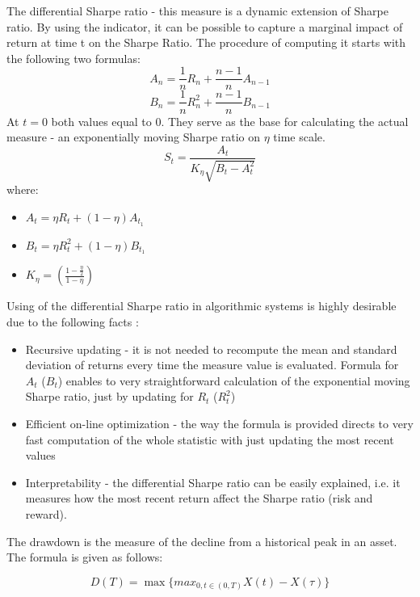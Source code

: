 \documentclass{pracamgr_wne}\usepackage[]{graphicx}\usepackage[]{color}
\begin{document}
The differential Sharpe ratio - this measure is a dynamic extension of Sharpe ratio. By using the indicator, it can be possible to capture a marginal impact of return at time t on the Sharpe Ratio. The procedure of computing it starts with the following two formulas:
\begin{equation}
A_n=\frac{1}{n}R_n+\frac{n-1}{n}A_{n-1}
\end{equation}
\begin{equation}
B_n=\frac{1}{n}R_n^2+\frac{n-1}{n}B_{n-1}
\end{equation}
At $t=0$ both values equal to 0. They serve as the base for calculating the actual measure - an exponentially moving Sharpe ratio on $\eta$ time scale.
\begin{equation}
S_t=\frac{A_t}{K_\eta\sqrt{B_t-A_t^2}}
\end{equation}
where:
\begin{itemize}
\item $A_t=\eta R_t+(1-\eta)A_{t_1}$ 
\item $B_t=\eta R_t^2+(1-\eta)B_{t_1}$ 
\item $K_\eta=(\frac{1-\frac{\eta}{2}}{1-\eta})$
\end{itemize}

Using of the differential Sharpe ratio in algorithmic systems is highly desirable due to the following facts \cite{Moody1997}:
\begin{itemize}
\item Recursive updating - it is not needed to recompute the mean and standard deviation of returns every time the measure value is evaluated. 
Formula for $A_t$ ($B_t$) enables to very straightforward calculation of the exponential moving Sharpe ratio, just by updating for  $R_t$ ($R_t^2$)
\item Efficient on-line optimization - the way the formula is provided directs to very fast computation of the whole statistic with just updating the most recent values
\item Interpretability - the differential Sharpe ratio can be easily explained, i.e. it measures how the most recent return affect the Sharpe ratio (risk and reward).
\end{itemize}


The drawdown is the measure of the decline from a historical peak in an asset.
The formula is given as follows:

\begin{equation}
D(T)=\max\{max_{0, t\in (0,T)} X(t)-X(\tau)\}
\end{equation}
\end{document}
